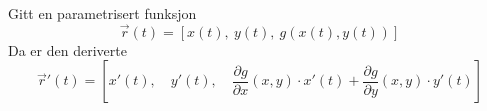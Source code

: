 Gitt en parametrisert funksjon
$$\vec{r}(t) = [x(t),\: y(t),\: g(x(t),y(t))]$$
Da er den deriverte
$$\vec{r}'(t) = [x'(t),\quad y'(t),\quad
    \frac{\partial g}{\partial x}(x,y)\cdot x'(t)
    + \frac{\partial g}{\partial y}(x,y)\cdot y'(t)]$$
